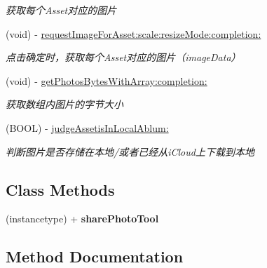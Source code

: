 \begin{DoxyCompactItemize}
\begin{DoxyCompactList}\small\item\em 获取每个\+Asset对应的图片 \end{DoxyCompactList}\item 
\mbox{\label{interface_z_l_photo_tool_acaafe0b274e7629075858643d6ddfaa6}} 
(void) -\/ \mbox{\hyperlink{interface_z_l_photo_tool_acaafe0b274e7629075858643d6ddfaa6}{request\+Image\+For\+Asset\+:scale\+:resize\+Mode\+:completion\+:}}
\begin{DoxyCompactList}\small\item\em 点击确定时，获取每个\+Asset对应的图片（image\+Data） \end{DoxyCompactList}\item 
\mbox{\label{interface_z_l_photo_tool_ac96c5633bdf6ee17a167b24872c4690c}} 
(void) -\/ \mbox{\hyperlink{interface_z_l_photo_tool_ac96c5633bdf6ee17a167b24872c4690c}{get\+Photos\+Bytes\+With\+Array\+:completion\+:}}
\begin{DoxyCompactList}\small\item\em 获取数组内图片的字节大小 \end{DoxyCompactList}\item 
\mbox{\label{interface_z_l_photo_tool_adbfd158b134e8aa2ad36954a742378ff}} 
(B\+O\+OL) -\/ \mbox{\hyperlink{interface_z_l_photo_tool_adbfd158b134e8aa2ad36954a742378ff}{judge\+Assetis\+In\+Local\+Ablum\+:}}
\begin{DoxyCompactList}\small\item\em 判断图片是否存储在本地/或者已经从i\+Cloud上下载到本地 \end{DoxyCompactList}\end{DoxyCompactItemize}
\subsection*{Class Methods}
\begin{DoxyCompactItemize}
\item 
\mbox{\label{interface_z_l_photo_tool_a69ab55d4528ea02a62600764b54534ad}} 
(instancetype) + {\bfseries share\+Photo\+Tool}
\end{DoxyCompactItemize}


\subsection{Method Documentation}
\mbox{\label{interface_z_l_photo_tool_abe37f30dee26fab43e9912e249b244ec}} 
